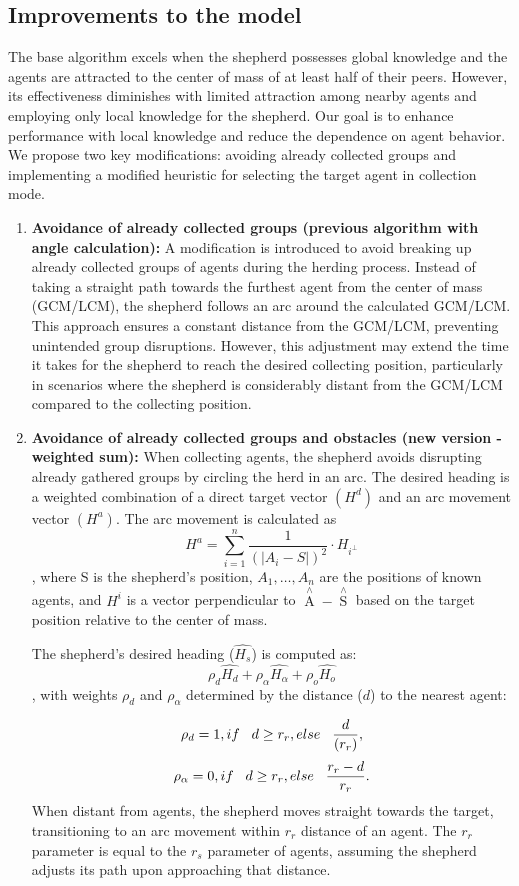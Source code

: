 \documentclass[9pt]{pnas-new}
\begin{document}
\subsection{Improvements to the model}
The base algorithm excels when the shepherd possesses global knowledge and the agents are attracted to the center of mass of at least half of their peers. However, its effectiveness diminishes with limited attraction among nearby agents and employing only local knowledge for the shepherd. Our goal is to enhance performance with local knowledge and reduce the dependence on agent behavior. We propose two key modifications: avoiding already collected groups and implementing a modified heuristic for selecting the target agent in collection mode.
\begin{enumerate}
    \item \textbf{Avoidance of already collected groups (previous algorithm with angle calculation):}
    A modification is introduced to avoid breaking up already collected groups of agents during the herding process. Instead of taking a straight path towards the furthest agent from the center of mass (GCM/LCM), the shepherd follows an arc around the calculated GCM/LCM. This approach ensures a constant distance from the GCM/LCM, preventing unintended group disruptions. However, this adjustment may extend the time it takes for the shepherd to reach the desired collecting position, particularly in scenarios where the shepherd is considerably distant from the GCM/LCM compared to the collecting position.
    \item \textbf{Avoidance of already collected groups and obstacles (new version - weighted sum):}
    When collecting agents, the shepherd avoids disrupting already gathered groups by circling the herd in an arc. The desired heading is a weighted combination of a direct target vector $(H^d)$ and an arc movement vector $(H^a)$. The arc movement is calculated as $$H^a = \sum^n_{i=1}\frac{1}{(|A_i - S|)^2} \cdot H_{i^\bot}$$, where S is the shepherd's position, $A_1,\dots, A_n$ are the positions of known agents, and $H^i$ is a vector perpendicular to $\mathop{A{}}\limits^\wedge -\mathop{S{}}\limits^\wedge$ based on the target position relative to the center of mass.
    
The shepherd's desired heading ($\hat{H_s}$) is computed as: $$\rho_d\hat{H{_d}} + \rho_\alpha\hat{H{_\alpha}} + \rho_o\hat{H_o}$$, with weights $\rho_d$ and $\rho_\alpha$ determined by the distance ($d$) to the nearest agent:

$$\rho_d = 1, if \hspace{0,3cm} d \geq r_r, else \hspace{0,3cm}  \frac{d}{(r_r)},$$
$$\rho_\alpha = 0, if \hspace{0,3cm} d \geq r_r, else \hspace{0,3cm} \frac{r_r - d}{r_r}.$$
When distant from agents, the shepherd moves straight towards the target, transitioning to an arc movement within $r_r$ distance of an agent. The $r_r$ parameter is equal to the $r_s$ parameter of agents, assuming the shepherd adjusts its path upon approaching that distance.


\end{enumerate}
\end{document}
